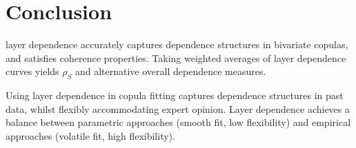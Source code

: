 \documentclass[authoryear]{elsarticle}
\begin{document}
\section{Conclusion}\label{sconclusion}

layer dependence accurately captures dependence structures in bivariate copulas, and satisfies coherence properties. Taking weighted averages of layer dependence curves yields  $\rho_S$ and alternative overall dependence measures.

Using layer dependence in copula fitting captures dependence structures in past data, whilst flexibly accommodating expert opinion. Layer dependence achieves a balance between parametric approaches (smooth fit, low flexibility) and empirical approaches (volatile fit, high flexibility).


\newpage

\newpage


\end{document}
